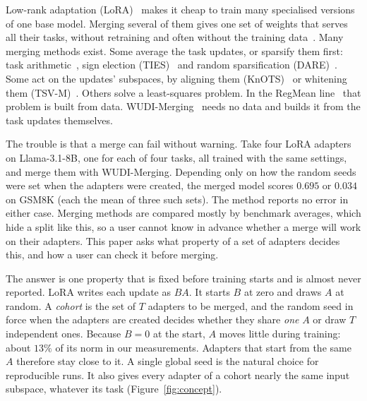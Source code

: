 Low-rank adaptation (LoRA)~\citep{hu2022lora} makes it cheap to train many
specialised versions of one base model. Merging several of them gives one set
of weights that serves all their tasks, without retraining and often without
the training data~\citep{ilharco2023task,jin2023regmean}. Many merging methods
exist. Some average the task
updates, or sparsify them first: task arithmetic~\citep{ilharco2023task}, sign
election (TIES)~\citep{yadav2023ties} and random sparsification
(DARE)~\citep{yu2024dare}. Some act on the updates' subspaces, by aligning
them (KnOTS)~\citep{stoica2025knots} or whitening them
(TSV-M)~\citep{gargiulo2025tsv}. Others solve a least-squares problem. In the
RegMean line~\citep{jin2023regmean,tam2024mats} that problem is built from
data. WUDI-Merging~\citep{cheng2025wudi} needs no data and builds it from the
task updates themselves.

The trouble is that a merge can fail without warning. Take four LoRA adapters
on Llama-3.1-8B, one for each of four tasks, all trained with the same
settings, and merge them with WUDI-Merging. Depending only on how the random
seeds were set when the adapters were created, the merged model scores
$0.695$ or $0.034$ on GSM8K (each the mean of three such sets). The method
reports no error in either case. Merging methods are compared mostly by
benchmark averages, which hide a split like this, so a user cannot know in
advance whether a merge will work on their adapters. This paper asks what
property of a set of adapters decides this, and how a user can check it before
merging.

The answer is one property that is fixed before training starts and is almost
never reported. LoRA writes each update as $BA$.
It starts $B$ at zero and draws $A$ at random. A \emph{cohort} is the set of
$T$ adapters to be merged, and the random seed in force when the adapters are
created decides whether they share \emph{one} $A$ or draw $T$ independent
ones. Because $B = 0$ at the start, $A$ moves little during training: about
$13\%$ of its norm in our measurements. Adapters that start from the same $A$
therefore stay close to it. A single global seed is the natural choice for
reproducible runs. It also gives every adapter of a cohort nearly the same
input subspace, whatever its task
(Figure~\ref{fig:concept}).

